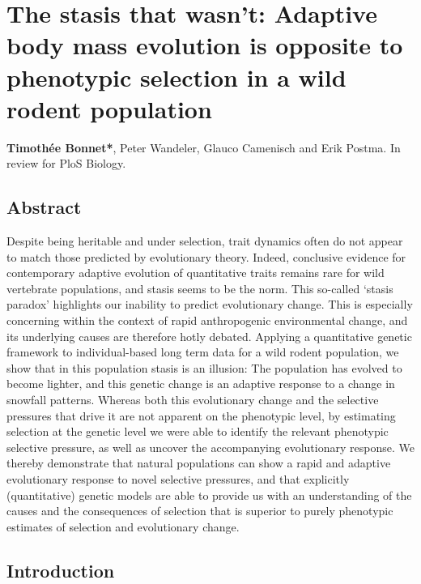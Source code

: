 

\chapter[\texorpdfstring{Chapter 4 \\ The stasis that wasn't: Adaptive body mass evolution is opposite to phenotypic selection in a wild rodent population}{Chapter 4 -- The stasis that wasn't: Adaptive body mass evolution is opposite to phenotypic selection in a wild rodent population}]{The stasis that wasn't: Adaptive body mass evolution is opposite to phenotypic selection in a wild rodent population}
\label{chap:stasis}

\textbf{Timoth\'{e}e Bonnet*}, Peter Wandeler, Glauco Camenisch and Erik Postma. In review for PloS Biology. 

\section{Abstract}
Despite being heritable and under selection, trait dynamics often do not appear to match those predicted by evolutionary theory. Indeed, conclusive evidence for contemporary adaptive evolution of quantitative traits remains rare for wild vertebrate populations, and stasis seems to be the norm. 
This so-called `stasis paradox' highlights our inability to predict evolutionary change. This is especially concerning within the context of rapid anthropogenic environmental change, and its underlying causes are therefore hotly debated.
Applying a quantitative genetic framework to individual-based long term data for a wild rodent population, we show that in this population stasis is an illusion: The population has evolved to become lighter, and this genetic change is an adaptive response to a change in snowfall patterns. Whereas both this evolutionary change and the selective pressures that drive it are not apparent on the phenotypic level, by estimating selection at the genetic level we were able to identify the relevant phenotypic selective pressure, as well as uncover the accompanying evolutionary response.
We thereby demonstrate that natural populations can show a rapid and adaptive evolutionary response to novel selective pressures, and that explicitly (quantitative) genetic models are able to provide us with an understanding of the causes and the consequences of selection that is superior to purely phenotypic estimates of selection and evolutionary change.


\section[Introduction]{Introduction}

